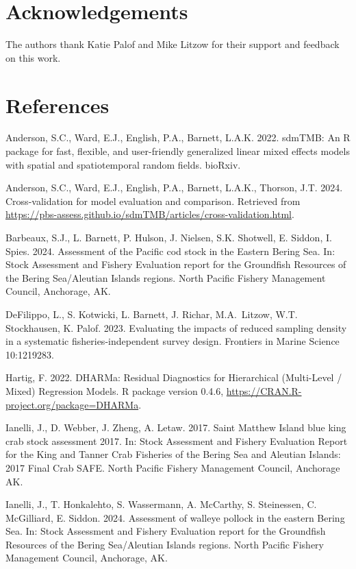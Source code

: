 \documentclass[
]{article}
\begin{document}
\section*{Acknowledgements}\label{acknowledgements}

The authors thank Katie Palof and Mike Litzow for their support and feedback on this work.

\clearpage

\section*{References}\label{references}

Anderson, S.C., Ward, E.J., English, P.A., Barnett, L.A.K. 2022. sdmTMB: An R package for fast, flexible, and user-friendly generalized linear mixed effects models with spatial and spatiotemporal random fields. bioRxiv.

Anderson, S.C., Ward, E.J., English, P.A., Barnett, L.A.K., Thorson, J.T. 2024. Cross-validation for model evaluation and comparison. Retrieved from \url{https://pbs-assess.github.io/sdmTMB/articles/cross-validation.html}.

Barbeaux, S.J., L. Barnett, P. Hulson, J. Nielsen, S.K. Shotwell, E. Siddon, I. Spies. 2024. Assessment of the Pacific cod stock in the Eastern Bering Sea. In: Stock Assessment and Fishery Evaluation report for the Groundfish Resources of the Bering Sea/Aleutian Islands regions. North Pacific Fishery Management Council, Anchorage, AK.

DeFilippo, L., S. Kotwicki, L. Barnett, J. Richar, M.A.~Litzow, W.T. Stockhausen, K. Palof. 2023. Evaluating the impacts of reduced sampling density in a systematic fisheries-independent survey design. Frontiers in Marine Science 10:1219283.

Hartig, F. 2022. DHARMa: Residual Diagnostics for Hierarchical (Multi-Level / Mixed) Regression Models. R package version 0.4.6, \url{https://CRAN.R-project.org/package=DHARMa}.

Ianelli, J., D. Webber, J. Zheng, A. Letaw. 2017. Saint Matthew Island blue king crab stock assessment 2017. In: Stock Assessment and Fishery Evaluation Report for the King and Tanner Crab Fisheries of the Bering Sea and Aleutian Islands: 2017 Final Crab SAFE. North Pacific Fishery Management Council, Anchorage AK.

Ianelli, J., T. Honkalehto, S. Wassermann, A. McCarthy, S. Steinessen, C. McGilliard, E. Siddon. 2024. Assessment of walleye pollock in the eastern Bering Sea. In: Stock Assessment and Fishery Evaluation report for the Groundfish Resources of the Bering Sea/Aleutian Islands regions. North Pacific Fishery Management Council, Anchorage, AK.
\end{document}
